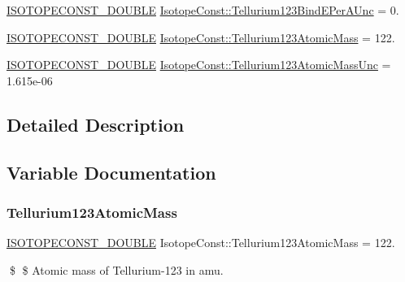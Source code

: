 \begin{DoxyCompactItemize}
\mbox{\hyperlink{group___isotope_const-_macros_ga8f45a7272ce02c0b4c65c44636ed719a}{I\+S\+O\+T\+O\+P\+E\+C\+O\+N\+S\+T\+\_\+\+D\+O\+U\+B\+LE}} \mbox{\hyperlink{group___isotope_const-_tellurium-_te123_gad9ba126730f02181c74e6d2f80781d1f}{Isotope\+Const\+::\+Tellurium123\+Bind\+E\+Per\+A\+Unc}} = 0.
\item 
\mbox{\hyperlink{group___isotope_const-_macros_ga8f45a7272ce02c0b4c65c44636ed719a}{I\+S\+O\+T\+O\+P\+E\+C\+O\+N\+S\+T\+\_\+\+D\+O\+U\+B\+LE}} \mbox{\hyperlink{group___isotope_const-_tellurium-_te123_ga9df189c02b03e2ac14946a1874262c31}{Isotope\+Const\+::\+Tellurium123\+Atomic\+Mass}} = 122.
\item 
\mbox{\hyperlink{group___isotope_const-_macros_ga8f45a7272ce02c0b4c65c44636ed719a}{I\+S\+O\+T\+O\+P\+E\+C\+O\+N\+S\+T\+\_\+\+D\+O\+U\+B\+LE}} \mbox{\hyperlink{group___isotope_const-_tellurium-_te123_ga45595d76d0adb209e0f987719dc94628}{Isotope\+Const\+::\+Tellurium123\+Atomic\+Mass\+Unc}} = 1.\+615e-\/06
\end{DoxyCompactItemize}


\subsection{Detailed Description}


\subsection{Variable Documentation}
\mbox{\label{group___isotope_const-_tellurium-_te123_ga9df189c02b03e2ac14946a1874262c31}} 
\subsubsection{\texorpdfstring{Tellurium123\+Atomic\+Mass}{Tellurium123AtomicMass}}
{\footnotesize\ttfamily \mbox{\hyperlink{group___isotope_const-_macros_ga8f45a7272ce02c0b4c65c44636ed719a}{I\+S\+O\+T\+O\+P\+E\+C\+O\+N\+S\+T\+\_\+\+D\+O\+U\+B\+LE}} Isotope\+Const\+::\+Tellurium123\+Atomic\+Mass = 122.}

\$ \$ Atomic mass of Tellurium-\/123 in amu. \mbox{\label{group___isotope_const-_tellurium-_te123_ga45595d76d0adb209e0f987719dc94628}} 
